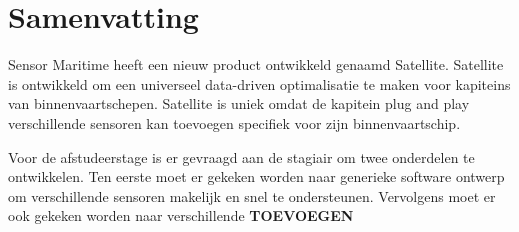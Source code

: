\chapter*{Samenvatting}
Sensor Maritime heeft een nieuw product ontwikkeld genaamd Satellite. Satellite is ontwikkeld om een universeel data-driven optimalisatie te maken voor kapiteins van binnenvaartschepen. Satellite is uniek omdat de kapitein plug and play verschillende sensoren kan toevoegen specifiek voor zijn binnenvaartschip. 

Voor de afstudeerstage is er gevraagd aan de stagiair om twee onderdelen te ontwikkelen. Ten eerste moet er gekeken worden naar generieke software ontwerp om verschillende sensoren makelijk en snel te ondersteunen. Vervolgens moet er ook gekeken worden naar verschillende 
{\color{red} \textbf{TOEVOEGEN}}

